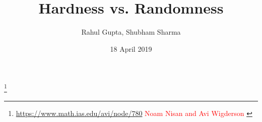 \documentclass[xcolor={table,dvipsnames,usenames}]{beamer}
\title{Hardness vs. Randomness}
\author{Rahul Gupta\inst{1}, 
	Shubham Sharma\inst{1}}
\institute[Universities of Somewhere and Elsewhere] %
{
  \inst{1}%
  Indian Institute of Technology Kanpur, India}
\date{18 April 2019}
\begin{document}
\newcommand{\ddnnf}{\ensuremath{\mathsf{dag}}}
\newcommand{\Poly}{\ensuremath{\mathsf{P}}}
\newcommand{\NP}{\ensuremath{\mathsf{NP}}}
\newcommand{\WAPS}{\ensuremath{\mathsf{WAPS}}}
\newcommand{\KUS}{\ensuremath{\mathsf{KUS}}}
\newcommand{\DSPACE}{\ensuremath{\mathsf{DSPACE}}}
\newcommand{\EXPTIME}{\ensuremath{\mathsf{EXPTIME}}}
\newcommand{\RNC}{\ensuremath{\mathsf{RNC}}}
\newcommand{\BPP}{\ensuremath{\mathsf{BPP}}}
\newcommand{\DTIME}{\ensuremath{\mathsf{DTIME}}}
\newcommand{\RTIME}{\ensuremath{\mathsf{RTIME}}}
\newcommand{\WeightGen}{\ensuremath{\mathsf{WeightGen}}}
\newcommand{\prob}{\ensuremath{\mathsf{Pr}}}
\newcommand{\UniGen}{\ensuremath{\mathsf{UniGen2}}}
\newcommand{\satisfying}[1]{\ensuremath{R_{#1}}} %
\newcommand{\satisfyingv}[2]{\ensuremath{R_{#1\downarrow #2}}}
\newcommand{\Sampler}{\ensuremath{\mathsf{Sampler}}}
\newcommand{\sampleList}{\ensuremath{\mathsf{SampleList}}}
\newcommand{\Shuffle}{\ensuremath{\mathsf{Shuffle}}}
\newcommand{\Append}{\ensuremath{\mathsf{Append}}}
\newcommand{\Stitch}{\ensuremath{\mathsf{Stitch}}}
\newcommand{\IS}{\ensuremath{\mathsf{IS}}}
\newcommand{\normalize}{\ensuremath{\mathsf{Normalize}}}
\newcommand{\WCounter}{\ensuremath{\mathsf{WAnnotate}}}
\newcommand{\PCompile}{\ensuremath{\mathsf{PCompile}}}


\begin{frame}
  \titlepage
  \begin{center}
  	\footnote{\href{https://www.math.ias.edu/avi/node/780}{https://www.math.ias.edu/avi/node/780} \textcolor{red}{Noam Nisan and Avi Wigderson }}
  \end{center}
  
\end{frame}
\end{document}
